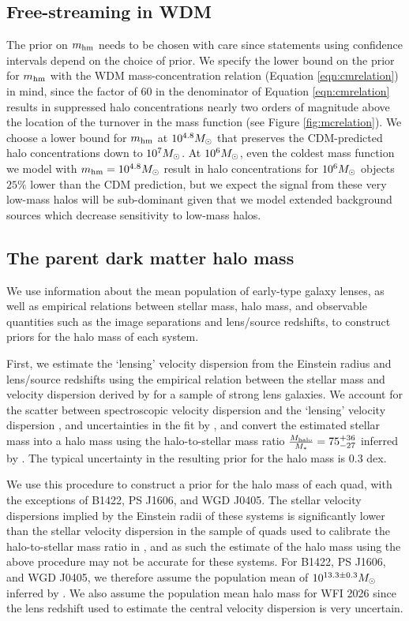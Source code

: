 \subsection{Free-streaming in WDM}
\label{ssec:wdmassumptions}
The prior on ${m_{\rm{hm}}}$ needs to be chosen with care since statements using confidence intervals depend on the choice of prior. We specify the lower bound on the prior for ${m_{\rm{hm}}}$ with the WDM mass-concentration relation (Equation \ref{eqn:cmrelation}) in mind, since the factor of 60 in the denominator of Equation \ref{eqn:cmrelation} results in suppressed halo concentrations nearly two orders of magnitude above the location of the turnover in the mass function (see Figure \ref{fig:mcrelation}). We choose a lower bound for ${m_{\rm{hm}}}$ at $10^{4.8} {M_{\odot}}$ that preserves the CDM-predicted halo concentrations down to $10^7 {M_{\odot}}$. At $10^6 {M_{\odot}}$, even the coldest mass function we model with ${m_{\rm{hm}}} = 10^{4.8} {M_{\odot}}$ result in halo concentrations for $10^{6} {M_{\odot}}$ objects $25\%$ lower than the CDM prediction, but we expect the signal from these very low-mass halos will be sub-dominant given that we model extended background sources which decrease sensitivity to low-mass halos. 

\subsection{The parent dark matter halo mass}
We use information about the mean population of early-type galaxy lenses, as well as empirical relations between stellar mass, halo mass, and observable quantities such as the image separations and lens/source redshifts, to construct priors for the halo mass of each system.  

First, we estimate the `lensing' velocity dispersion from the Einstein radius and lens/source redshifts using the empirical relation between the stellar mass and velocity dispersion derived by \citet{Auger++10} for a sample of strong lens galaxies. We account for the scatter between spectroscopic velocity dispersion and the `lensing' velocity dispersion \citep{Treu++06}, and uncertainties in the fit by \citet{Auger++10}, and convert the estimated stellar mass into a halo mass using the halo-to-stellar mass ratio $\frac{M_{\rm{halo}}}{M_{*}} = 75_{-27}^{+36}$ inferred by \citet{Lagattuta++10}. The typical uncertainty in the resulting prior for the halo mass is 0.3 dex. 

We use this procedure to construct a prior for the halo mass of each quad, with the exceptions of B1422, PS J1606, and WGD J0405. The stellar velocity dispersions implied by the Einstein radii of these systems is significantly lower than the stellar velocity dispersion in the sample of quads used to calibrate the halo-to-stellar mass ratio in \citet{Lagattuta++10}, and as such the estimate of the halo mass using the above procedure may not be accurate for these systems. For B1422, PS J1606, and WGD J0405, we therefore assume the population mean of $10^{13.3 \pm 0.3} {M_{\odot}}$ inferred by \citet{Lagattuta++10}. We also assume the population mean halo mass for WFI 2026 since the lens redshift used to estimate the central velocity dispersion is very uncertain. 

